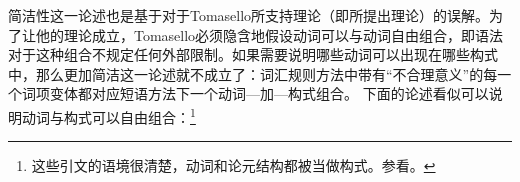     简洁性这一论述也是基于对于Tomasello所支持理论（即\citet{Goldberg95a, Goldberg2006a}所提出理论）的误解。为了让他的理论成立，Tomasello必须隐含地假设动词可以与动词自由组合，即语法对于这种组合不规定任何外部限制。如果需要说明哪些动词可以出现在哪些构式中，那么更加简洁这一论述就不成立了：词汇规则方法中带有“不合理意义”的每一个词项变体都对应短语方法下一个动词—加—构式组合。
    下面的论述看似可以说明动词与构式可以自由组合：\footnote{这些引文的语境很清楚，动词和论元结构都被当做构式。参看\citet[, ex.~(2)]{Goldberg2006a}。} 


